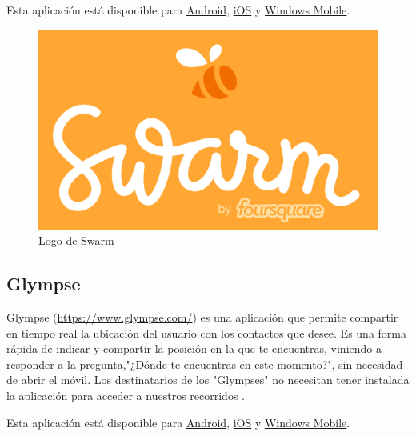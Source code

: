 Esta aplicación está disponible para \href{https://play.google.com/store/apps/details?id=com.foursquare.robin}{Android}, \href{https://itunes.apple.com/US/app/id870161082?mt=8}{iOS} y \href{https://www.microsoft.com/es-es/store/apps/swarm/9wzdncrdrsq1}{Windows Mobile}.

\begin{figure}[h!btp]
\centering
\includegraphics[scale=0.25, fbox={\fboxrule} 4mm]{images/03-antecedentes/39-swarm.png}
\caption{Logo de Swarm}
\label{fig:swarm}
\end{figure}

\subsection{Glympse}
Glympse (\url{https://www.glympse.com/}) es una aplicación que permite compartir en tiempo real la ubicación del usuario con los contactos que desee. Es una forma rápida de indicar y compartir la posición en la que te encuentras, viniendo a responder a la pregunta,"¿Dónde te encuentras en este momento?", sin necesidad de abrir el móvil. Los destinatarios de los "Glympses" no necesitan tener instalada la aplicación para acceder a nuestros recorridos \cite{Unk15}.

Esta aplicación está disponible para \href{https://play.google.com/store/apps/details?id=com.glympse.android.glympse}{Android}, \href{https://itunes.apple.com/app/glympse-share-gps-location/id330316698?mt=8}{iOS} y \href{https://www.microsoft.com/es-es/store/apps/glympse/9wzdncrdf9sj}{Windows Mobile}.

